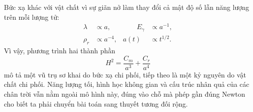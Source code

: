 Bức xạ khác với vật chất vì sự giãn nở làm thay đổi cả mật độ số lẫn năng lượng trên mỗi lượng tử:
\begin{equation}
\begin{aligned}
\lambda&\propto a,
&\qquad E_\gamma&\propto a^{-1},\\
\rho_r&\propto a^{-4},
& a(t)&\propto t^{1/2}.
\end{aligned}
\end{equation}
Vì vậy, phương trình hai thành phần
\begin{equation}
H^2=\frac{C_m}{a^3}+\frac{C_r}{a^4}
\end{equation}
mô tả một vũ trụ sơ khai do bức xạ chi phối, tiếp theo là một kỷ nguyên do vật chất chi phối. Năng lượng tối, hình học không gian và cấu trúc nhân quả của các chân trời vẫn nằm ngoài mô hình này, đúng vào chỗ mà phép gần đúng Newton cho biết ta phải chuyển bài toán sang thuyết tương đối rộng.

